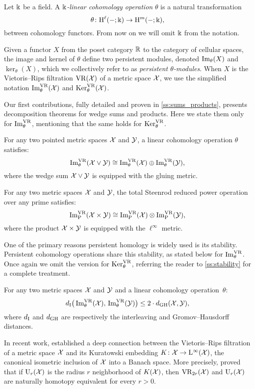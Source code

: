 Let \(\Bbbk\) be a field.
A \textit{\(\Bbbk\)-linear cohomology operation} \(\theta\) is a natural transformation
\[
\theta \colon \mathrm{H}^\ell(-;\Bbbk) \to \mathrm{H}^m(-;\Bbbk),
\]
between cohomology functors.
From now on we will omit \(\Bbbk\) from the notation.

Given a functor \(X\) from the poset category $\mathbb{R}$ to the category of cellular spaces, the image and kernel of \(\theta\) define two persistent modules, denoted \(\operatorname{Im}_\theta(X)\) and \(\ker_\theta(X)\), which we collectively refer to as \textit{persistent \(\theta\)-modules}.
When \(X\) is the Vietoris--Rips filtration \(\mathrm{VR}(\mathcal{X})\) of a metric space \(\mathcal{X}\), we use the simplified notation \(\operatorname{Im}_\theta^{\mathrm{VR}}(\mathcal{X})\) and \(\operatorname{Ker}_\theta^{\mathrm{VR}}(\mathcal{X})\).

Our first contributions, fully detailed and proven in \cref{ss:sums_products}, presents decomposition theorems for wedge sums and products.
Here we state them only for \(\operatorname{Im}^{\mathrm{VR}}_\theta\), mentioning that the same holds for \(\operatorname{Ker}^{\mathrm{VR}}_\theta\).

\medskip\theorem For any two pointed metric spaces $\mathcal{X}$ and $\mathcal{Y}$, a linear cohomology operation \(\theta\) satisfies:
\[
\operatorname{Im}_\theta^{\mathrm{VR}}(\mathcal{X} \vee \mathcal{Y}) \cong \operatorname{Im}_\theta^{\mathrm{VR}}(\mathcal{X}) \oplus \operatorname{Im}_\theta^{\mathrm{VR}}(\mathcal{Y}),
\]
where the wedge sum \(\mathcal{X} \vee \mathcal{Y}\) is equipped with the gluing metric.

\medskip\theorem
For any two metric spaces $\mathcal{X}$ and $\mathcal{Y}$, the total Steenrod reduced power operation over any prime satisfies:
\[
\operatorname{Im}^{\mathrm{VR}}_{\mathrm{P}}(\mathcal{X} \times \mathcal{Y}) \cong \operatorname{Im}^{\mathrm{VR}}_{\mathrm{P}}(\mathcal{X}) \otimes \operatorname{Im}^{\mathrm{VR}}_{\mathrm{P}}(\mathcal{Y}),
\]
where the product \(\mathcal{X} \times \mathcal{Y}\) is equipped with the \(\ell^\infty\) metric.

\medskip One of the primary reasons persistent homology is widely used is its stability.
Persistent cohomology operations share this stability, as stated below for \(\operatorname{Im}^{\mathrm{VR}}_\theta\).
Once again we omit the version for \(\operatorname{Ker}^{\mathrm{VR}}_\theta\), referring the reader to \cref{ss:stability} for a complete treatment.

\medskip\theorem For any two metric spaces $\mathcal{X}$ and $\mathcal{Y}$ and a linear cohomology operation~$\theta$:
\[
d_{\mathrm{I}}\big(\operatorname{Im}_\theta^{\mathrm{VR}}(\mathcal{X}),\, \operatorname{Im}_\theta^{\mathrm{VR}}(\mathcal{Y})\big) \leq 2 \cdot d_{\mathrm{GH}}(\mathcal{X},\mathcal{Y}),
\]
where \(d_{\mathrm{I}}\) and \(d_{\mathrm{GH}}\) are respectively the interleaving and Gromov--Hausdorff distances.

\medskip In recent work, \cite{lim2024vietoris} established a deep connection between the Vietoris--Rips filtration of a metric space \(\mathcal{X}\) and its Kuratowski embedding \(K \colon \mathcal{X} \to \mathrm{L}^\infty(\mathcal{X})\), the canonical isometric inclusion of \(\mathcal{X}\) into a Banach space.
More precisely, \cite{lim2024vietoris} proved that if \(\mathrm{U}_r(\mathcal{X})\) is the radius \(r\) neighborhood of \(K(\mathcal{X})\), then \(\mathrm{VR}_{2r}(\mathcal{X})\) and \(\mathrm{U}_r(\mathcal{X})\) are naturally homotopy equivalent for every \(r > 0\).

